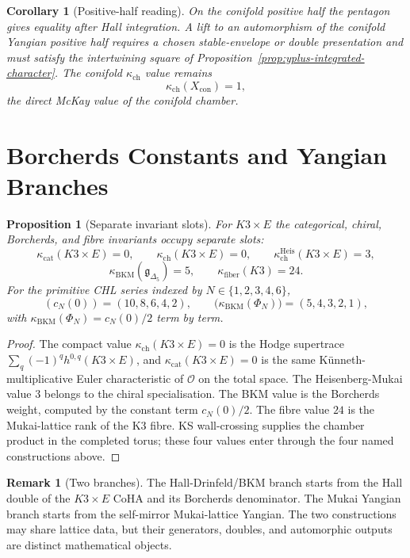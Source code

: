 \documentclass[11pt]{article}
\newtheorem{proposition}[theorem]{Proposition}
\newtheorem{corollary}[theorem]{Corollary}
\theoremstyle{definition}
\newtheorem{remark}[theorem]{Remark}
\providecommand{\kcat}{\kappa_{\mathrm{cat}}}
\providecommand{\kch}{\kappa_{\mathrm{ch}}}
\providecommand{\kBKM}{\kappa_{\mathrm{BKM}}}
\providecommand{\kfib}{\kappa_{\mathrm{fiber}}}
\begin{document}
\begin{corollary}[Positive-half reading]
On the conifold positive half the pentagon gives equality after Hall
integration. A lift to an automorphism of the conifold Yangian positive
half requires a chosen stable-envelope or double presentation and must
satisfy the intertwining square of
Proposition~\ref{prop:yplus-integrated-character}. The conifold
$\kch$ value remains
\[
 \kch(X_{\mathrm{con}})=1,
\]
the direct McKay value of the conifold chamber.
\end{corollary}

\section{Borcherds Constants and Yangian Branches}

\begin{proposition}[Separate invariant slots]
\label{prop:k3e-slots}
For $K3\times E$ the categorical, chiral, Borcherds, and fibre
invariants
occupy separate slots:
\[
 \kcat(K3\times E)=0,\qquad
 \kch(K3\times E)=0,\qquad
 \kch^{\mathrm{Heis}}(K3\times E)=3,
\]
\[
 \kBKM(\mathfrak{g}_{\Delta_5})=5,\qquad
 \kfib(K3)=24.
\]
For the primitive CHL series indexed by $N\in\{1,2,3,4,6\}$,
\[
 (c_N(0))=(10,8,6,4,2),\qquad
 \bigl(\kBKM(\Phi_N)\bigr)=(5,4,3,2,1),
\]
with $\kBKM(\Phi_N)=c_N(0)/2$ term by term.
\end{proposition}

\begin{proof}
The compact value $\kch(K3\times E)=0$ is the Hodge supertrace
$\sum_q(-1)^q h^{0,q}(K3\times E)$, and $\kcat(K3\times E)=0$ is the
same K\"unneth-multiplicative Euler characteristic of $\mathcal O$ on
the total space. The Heisenberg-Mukai value $3$ belongs to the chiral
specialisation. The BKM value is the Borcherds weight, computed by the
constant term $c_N(0)/2$. The fibre value $24$ is the Mukai-lattice
rank of the K3 fibre. KS wall-crossing supplies the chamber product in
the completed torus; these four values enter through the four named
constructions above.
\end{proof}

\begin{remark}[Two branches]
The Hall-Drinfeld/BKM branch starts from the Hall double of the
$K3\times E$ CoHA and its Borcherds denominator. The Mukai Yangian branch
starts from the self-mirror Mukai-lattice Yangian. The two constructions
may share lattice data, but their generators, doubles, and automorphic
outputs are distinct mathematical objects.
\end{remark}
\end{document}
